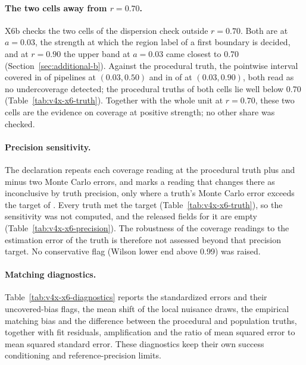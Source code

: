 \paragraph{The two cells away from $r=0.70$.}
X6b checks the two cells of the dispersion check outside $r=0.70$. Both are at $a=0.03$, the strength at which the region label of a first boundary is decided, and at $r=0.90$ the upper band at $a=0.03$ came closest to 0.70 (Section~\ref{sec:additional-b}). Against the procedural truth, the pointwise interval covered in  of  pipelines at $(0.03,0.50)$ and in  of  at $(0.03,0.90)$, both read as no undercoverage detected; the procedural truths of both cells lie well below 0.70 (Table~\ref{tab:v4x-x6-truth}). Together with the whole unit at $r=0.70$, these two cells are the evidence on coverage at positive strength; no other share was checked.

\paragraph{Precision sensitivity.}
The declaration repeats each coverage reading at the procedural truth plus and minus two Monte Carlo errors, and marks a reading that changes there as inconclusive by truth precision, only where a truth's Monte Carlo error exceeds the target of . Every truth met the target (Table~\ref{tab:v4x-x6-truth}), so the sensitivity was not computed, and the released fields for it are empty (Table~\ref{tab:v4x-x6-precision}). The robustness of the coverage readings to the estimation error of the truth is therefore not assessed beyond that precision target. No conservative flag (Wilson lower end above 0.99) was raised.

\paragraph{Matching diagnostics.}
Table~\ref{tab:v4x-x6-diagnostics} reports the standardized errors and their uncovered-bias flags, the mean shift of the local nuisance draws, the empirical matching bias and the difference between the procedural and population truths, together with fit residuals, amplification and the ratio of mean squared error to mean squared standard error. These diagnostics keep their own success conditioning and reference-precision limits.

